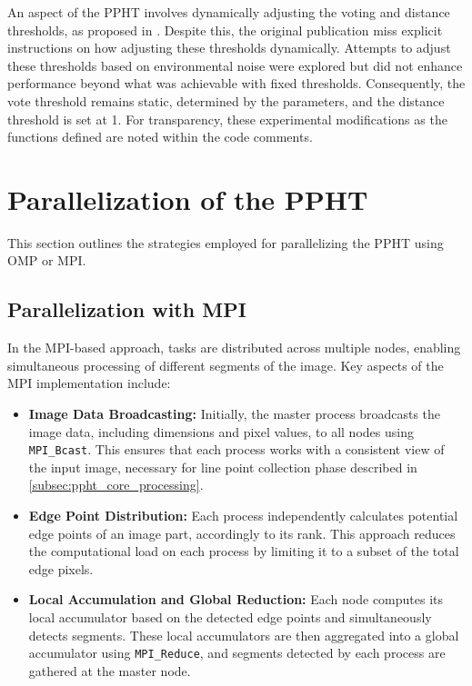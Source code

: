 \documentclass[conference]{IEEEtran}
\begin{document}
        An aspect of the PPHT involves dynamically adjusting the voting and distance thresholds, as proposed in \cite{PPHT}. Despite this, the original publication miss explicit instructions on how adjusting these thresholds dynamically. Attempts to adjust these thresholds based on environmental noise were explored but did not enhance performance beyond what was achievable with fixed thresholds. Consequently, the vote threshold remains static, determined by the parameters, and the distance threshold is set at 1. For transparency, these experimental modifications as the functions defined are noted within the code comments.

\section{Parallelization of the PPHT}
\label{sec:ppht_parallel}

    This section outlines the strategies employed for parallelizing the PPHT using OMP or MPI.
        
    \subsection{Parallelization with MPI}
    \label{subsec:ppht_mpi}
        
        In the MPI-based approach, tasks are distributed across multiple nodes, enabling simultaneous processing of different segments of the image. Key aspects of the MPI implementation include:
        
        \begin{itemize}
            \item \textbf{Image Data Broadcasting:} Initially, the master process broadcasts the image data, including dimensions and pixel values, to all nodes using \texttt{MPI\_Bcast}. This ensures that each process works with a consistent view of the input image, necessary for line point collection phase described in \ref{subsec:ppht_core_processing}.
            
            \item \textbf{Edge Point Distribution:} Each process independently calculates potential edge points of an image part, accordingly to its rank. This approach reduces the computational load on each process by limiting it to a subset of the total edge pixels.
            
            \item \textbf{Local Accumulation and Global Reduction:} Each node computes its local accumulator based on the detected edge points and simultaneously detects segments. These local accumulators are then aggregated into a global accumulator using \texttt{MPI\_Reduce}, and segments detected by each process are gathered at the master node.
        \end{itemize}
\end{document}

